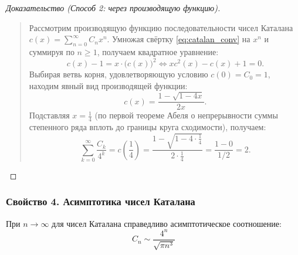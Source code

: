\begin{proof}[Доказательство (Способ 2: через производящую функцию)]~\\
    \begin{quote}
        Рассмотрим производящую функцию последовательности чисел Каталана 
        $c(x) = \sum_{n=0}^\infty C_n x^n$. Умножая свёртку 
        \eqref{eq:catalan_conv} на $x^n$ и суммируя по $n \ge 1$, получаем 
        квадратное уравнение:
        \[
            c(x) - 1 = x \cdot \bigl(c(x)\bigr)^2 \iff 
            x c^2(x) - c(x) + 1 = 0.
        \]
        Выбирая ветвь корня, удовлетворяющую условию $c(0) = C_0 = 1$, 
        находим явный вид производящей функции:
        \[
            c(x) = \frac{1 - \sqrt{1 - 4x}}{2x}.
        \]
        Подставляя $x = \frac{1}{4}$ (по первой теореме Абеля о 
        непрерывности суммы степенного ряда вплоть до границы круга 
        сходимости), получаем:
        \[
            \sum_{k=0}^{\infty} \frac{C_k}{4^k} = c\left(\frac{1}{4}\right) = 
            \frac{1 - \sqrt{1 - 4 \cdot \frac{1}{4}}}{2 \cdot \frac{1}{4}} = 
            \frac{1 - 0}{1/2} = 2.
        \]
    \end{quote}
\end{proof}

\subsubsection{Свойство 4. Асимптотика чисел Каталана}

\begin{theorem}
    При $n \to \infty$ для чисел Каталана справедливо асимптотическое 
    соотношение:
    \begin{equation} \label{eq:catalan_asymp}
        C_n \sim \frac{4^n}{\sqrt{\pi n^3}} \tag{8}
    \end{equation}
\end{theorem}

